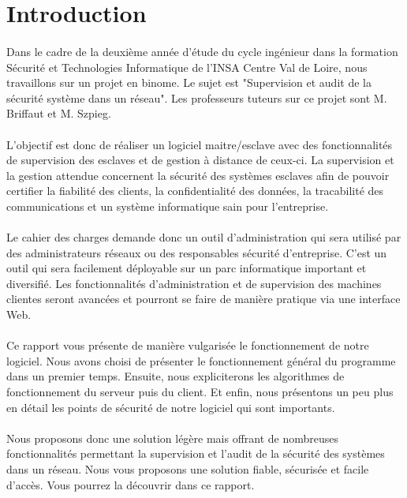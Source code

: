 \section*{Introduction}
\paragraph{}
Dans le cadre de la deuxième année d'étude du cycle ingénieur dans la formation Sécurité et Technologies Informatique de l'INSA Centre Val de Loire, nous travaillons sur un projet en binome.
Le sujet est "Supervision et audit de la sécurité système dans un réseau". Les professeurs tuteurs sur ce projet sont M. Briffaut et M. Szpieg.
\paragraph{}
L'objectif est donc de réaliser un logiciel maitre/esclave avec des fonctionnalités de supervision des esclaves et de gestion à distance de ceux-ci. 
La supervision et la gestion attendue concernent la sécurité des systèmes esclaves afin de pouvoir certifier la fiabilité des clients, la confidentialité des données, la tracabilité des communications et un système informatique sain pour l'entreprise.
\paragraph{}
Le cahier des charges demande donc un outil d'administration qui sera utilisé par des administrateurs réseaux ou des responsables sécurité d'entreprise. 
C'est un outil qui sera facilement déployable sur un parc informatique important et diversifié. Les fonctionnalités d'administration et de supervision des machines clientes seront avancées et pourront se faire de manière pratique via une interface Web.
\paragraph{}
Ce rapport vous présente de manière vulgarisée le fonctionnement de notre logiciel. Nous avons choisi de présenter le fonctionnement général du programme dans un premier temps. 
Ensuite, nous expliciterons les algorithmes de fonctionnement du serveur puis du client. Et enfin, nous présentons un peu plus en détail les points de sécurité de notre logiciel qui sont importants.
\paragraph{}
Nous proposons donc une solution légère mais offrant de nombreuses fonctionnalités permettant la supervision et l'audit de la sécurité des systèmes dans un réseau. 
Nous vous proposons une solution fiable, sécurisée et facile d'accès. Vous pourrez la découvrir dans ce rapport.
